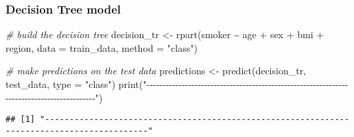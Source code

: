 \documentclass[
]{article}
\newenvironment{Shaded}{\begin{snugshade}}{\end{snugshade}}
\newcommand{\AttributeTok}[1]{\textcolor[rgb]{0.77,0.63,0.00}{#1}}
\newcommand{\CommentTok}[1]{\textcolor[rgb]{0.56,0.35,0.01}{\textit{#1}}}
\newcommand{\FunctionTok}[1]{\textcolor[rgb]{0.00,0.00,0.00}{#1}}
\newcommand{\NormalTok}[1]{#1}
\newcommand{\OtherTok}[1]{\textcolor[rgb]{0.56,0.35,0.01}{#1}}
\newcommand{\SpecialCharTok}[1]{\textcolor[rgb]{0.00,0.00,0.00}{#1}}
\newcommand{\StringTok}[1]{\textcolor[rgb]{0.31,0.60,0.02}{#1}}
\begin{document}
\hypertarget{decision-tree-model}{%
\subsubsection{Decision Tree model}\label{decision-tree-model}}

\begin{Shaded}
\begin{Highlighting}[]
\CommentTok{\# build the decision tree }
\NormalTok{decision\_tr }\OtherTok{\textless{}{-}} \FunctionTok{rpart}\NormalTok{(smoker }\SpecialCharTok{\textasciitilde{}}\NormalTok{ age }\SpecialCharTok{+}\NormalTok{ sex }\SpecialCharTok{+}\NormalTok{ bmi }\SpecialCharTok{+}\NormalTok{ region, }\AttributeTok{data =}\NormalTok{ train\_data, }\AttributeTok{method =} \StringTok{"class"}\NormalTok{)}

\CommentTok{\# make predictions on the test data}
\NormalTok{predictions }\OtherTok{\textless{}{-}} \FunctionTok{predict}\NormalTok{(decision\_tr, test\_data, }\AttributeTok{type =} \StringTok{"class"}\NormalTok{)}
\FunctionTok{print}\NormalTok{(}\StringTok{"{-}{-}{-}{-}{-}{-}{-}{-}{-}{-}{-}{-}{-}{-}{-}{-}{-}{-}{-}{-}{-}{-}{-}{-}{-}{-}{-}{-}{-}{-}{-}{-}{-}{-}{-}{-}{-}{-}{-}{-}{-}{-}{-}{-}{-}{-}{-}{-}{-}{-}{-}{-}{-}{-}{-}{-}{-}{-}{-}{-}{-}{-}{-}{-}{-}{-}{-}{-}{-}{-}{-}{-}{-}{-}{-}{-}{-}{-}{-}{-}{-}{-}{-}{-}{-}{-}{-}{-}{-}{-}{-}"}\NormalTok{)}
\end{Highlighting}
\end{Shaded}

\begin{verbatim}
## [1] "-------------------------------------------------------------------------------------------"
\end{verbatim}

\begin{Shaded}
\end{Shaded}
\end{document}
